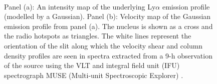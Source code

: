 \begin{figure}[!ht]
 \centering
 \\
 \caption[Intensity and velocity map from \citet{swinbank2015}]{Panel (a): An intensity map of the underlying Ly$\alpha$ emission profile (modelled by a Gaussian). Panel (b): Velocity map of the Gaussian emission profile from panel (a). The nucleus is shown as a cross and the radio hotspots as triangles. The white lines represent the orientation of the slit along which the velocity shear and  column density profiles are seen in spectra extracted from a 9-h observation of the source using the VLT and integral field unit (IFU) spectrograph MUSE (Multi-unit Spectroscopic Explorer) \citep{swinbank2015}.}
 \label{fig:TNJ1338-Swinbank2015}
\end{figure}

